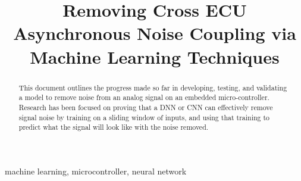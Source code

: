 \documentclass[conference]{IEEEtran}
\begin{document}
\title{Removing Cross ECU Asynchronous Noise Coupling via Machine Learning Techniques}

\author{
    \and
    \and
}

\maketitle

\begin{abstract}
This document outlines the progress made so far in developing, testing, and validating a model to remove noise from an analog signal on an embedded micro-controller. Research has been focused on proving that a DNN or CNN can effectively remove signal noise by training on a sliding window of inputs, and using that training to predict what the signal will look like with the noise removed. 
\end{abstract}

\begin{IEEEkeywords}
machine learning, microcontroller, neural network
\end{IEEEkeywords}
\end{document}
